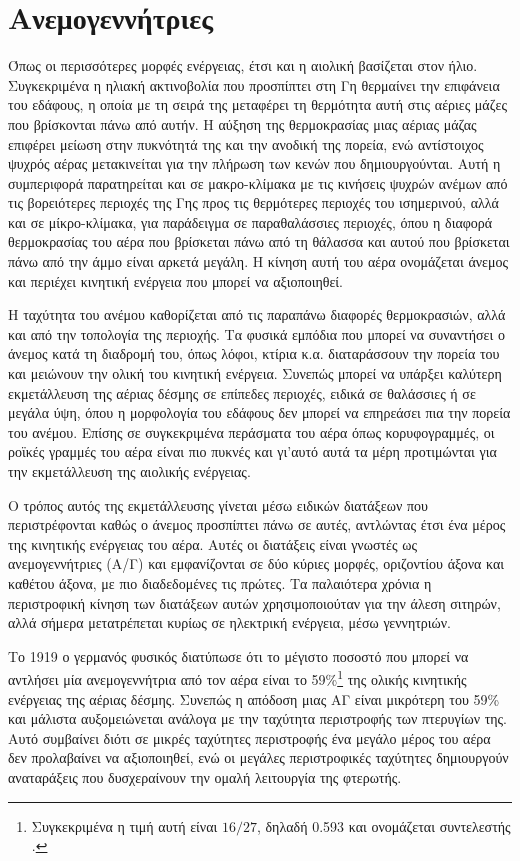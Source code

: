 \documentclass[12pt]{report}
\begin{document}
\section{Ανεμογεννήτριες}
Όπως οι περισσότερες μορφές ενέργειας, έτσι και η αιολική βασίζεται στον ήλιο. Συγκεκριμένα η ηλιακή ακτινοβολία που προσπίπτει στη Γη θερμαίνει την επιφάνεια του εδάφους, η οποία με τη σειρά της μεταφέρει τη θερμότητα αυτή 
στις αέριες μάζες που βρίσκονται πάνω από αυτήν. Η αύξηση της θερμοκρασίας μιας αέριας μάζας επιφέρει μείωση στην πυκνότητά της και την ανοδική της πορεία, ενώ αντίστοιχος ψυχρός αέρας μετακινείται για την πλήρωση των κενών
που δημιουργούνται. Αυτή η συμπεριφορά παρατηρείται και σε μακρο-κλίμακα με τις κινήσεις ψυχρών ανέμων από τις βορειότερες περιοχές της Γης προς τις θερμότερες περιοχές του ισημερινού, αλλά και σε μίκρο-κλίμακα, για παράδειγμα 
σε παραθαλάσσιες περιοχές, όπου η διαφορά θερμοκρασίας του αέρα που βρίσκεται πάνω από τη θάλασσα και αυτού που βρίσκεται πάνω από την άμμο είναι αρκετά μεγάλη. Η κίνηση αυτή του αέρα ονομάζεται άνεμος και περιέχει κινητική ενέργεια 
που μπορεί να αξιοποιηθεί.

Η ταχύτητα του ανέμου καθορίζεται από τις παραπάνω διαφορές θερμοκρασιών, αλλά και από την τοπολογία της περιοχής. Τα φυσικά εμπόδια που μπορεί να συναντήσει ο άνεμος κατά τη διαδρομή του, όπως λόφοι, κτίρια κ.α. διαταράσσουν την
πορεία του και μειώνουν την ολική του κινητική ενέργεια. Συνεπώς μπορεί να υπάρξει καλύτερη εκμετάλλευση της αέριας δέσμης σε επίπεδες περιοχές, ειδικά σε θαλάσσιες ή σε μεγάλα ύψη, όπου η μορφολογία του εδάφους δεν μπορεί να
επηρεάσει πια την πορεία του ανέμου. Επίσης σε συγκεκριμένα περάσματα του αέρα όπως κορυφογραμμές, οι ροϊκές γραμμές του αέρα είναι πιο πυκνές και γι'αυτό αυτά τα μέρη προτιμώνται για την εκμετάλλευση της αιολικής ενέργειας.

Ο τρόπος αυτός της εκμετάλλευσης γίνεται μέσω ειδικών διατάξεων που περιστρέφονται καθώς ο άνεμος προσπίπτει πάνω σε αυτές, αντλώντας έτσι ένα μέρος της κινητικής ενέργειας του αέρα. Αυτές οι διατάξεις είναι γνωστές ως
ανεμογεννήτριες (Α/Γ) και εμφανίζονται σε δύο κύριες μορφές, οριζοντίου άξονα και καθέτου άξονα, με πιο διαδεδομένες τις πρώτες. Τα παλαιότερα χρόνια η περιστροφική κίνηση των διατάξεων αυτών χρησιμοποιούταν για την άλεση σιτηρών, 
αλλά σήμερα μετατρέπεται κυρίως σε ηλεκτρική ενέργεια, μέσω γεννητριών.

Το 1919 ο γερμανός φυσικός {} διατύπωσε ότι το μέγιστο ποσοστό που μπορεί να αντλήσει μία ανεμογεννήτρια από τον αέρα είναι το 59\%\footnote{Συγκεκριμένα η τιμή αυτή είναι \(16/27\), δηλαδή 0.593 και 
ονομάζεται συντελεστής {}.} της ολικής κινητικής ενέργειας της αέριας δέσμης. Συνεπώς η απόδοση μιας ΑΓ είναι μικρότερη του 59\% και μάλιστα αυξομειώνεται ανάλογα με την ταχύτητα περιστροφής των πτερυγίων της. 
Αυτό συμβαίνει διότι σε μικρές ταχύτητες περιστροφής ένα μεγάλο μέρος του αέρα δεν προλαβαίνει να αξιοποιηθεί, ενώ οι μεγάλες περιστροφικές ταχύτητες δημιουργούν αναταράξεις που δυσχεραίνουν την ομαλή λειτουργία της φτερωτής.
\end{document}

